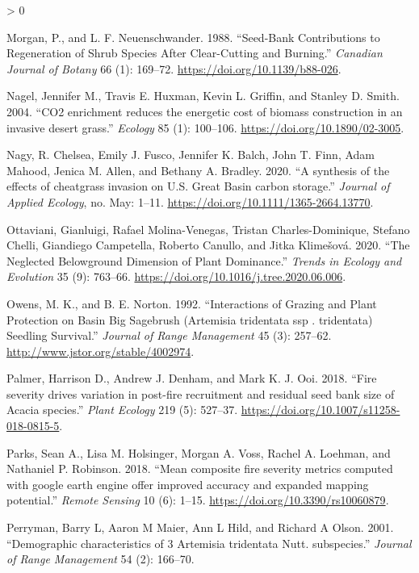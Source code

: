 \documentclass[
  12pt,
]{article}
\newlength{\cslhangindent}
\newenvironment{CSLReferences}[2] %
 {%
  \setlength{\parindent}{0pt}
  \ifodd #1 \everypar{\setlength{\hangindent}{\cslhangindent}}\ignorespaces\fi
  \ifnum #2 > 0
  \setlength{\parskip}{#2\baselineskip}
  \fi
 }%
 {}
\begin{document}
\begin{CSLReferences}{1}{0}
\leavevmode\hypertarget{ref-Morgan1988}{}%
Morgan, P., and L. F. Neuenschwander. 1988. {``Seed-Bank Contributions
to Regeneration of Shrub Species After Clear-Cutting and Burning.''}
\emph{Canadian Journal of Botany} 66 (1): 169--72.
\url{https://doi.org/10.1139/b88-026}.

\leavevmode\hypertarget{ref-Nagel2004}{}%
Nagel, Jennifer M., Travis E. Huxman, Kevin L. Griffin, and Stanley D.
Smith. 2004. {``{CO2 enrichment reduces the energetic cost of biomass
construction in an invasive desert grass}.''} \emph{Ecology} 85 (1):
100--106. \url{https://doi.org/10.1890/02-3005}.

\leavevmode\hypertarget{ref-Nagy2020}{}%
Nagy, R. Chelsea, Emily J. Fusco, Jennifer K. Balch, John T. Finn, Adam
Mahood, Jenica M. Allen, and Bethany A. Bradley. 2020. {``{A synthesis
of the effects of cheatgrass invasion on U.S. Great Basin carbon
storage}.''} \emph{Journal of Applied Ecology}, no. May: 1--11.
\url{https://doi.org/10.1111/1365-2664.13770}.

\leavevmode\hypertarget{ref-Ottaviani2020}{}%
Ottaviani, Gianluigi, Rafael Molina-Venegas, Tristan Charles-Dominique,
Stefano Chelli, Giandiego Campetella, Roberto Canullo, and Jitka
Klimešová. 2020. {``{The Neglected Belowground Dimension of Plant
Dominance}.''} \emph{Trends in Ecology and Evolution} 35 (9): 763--66.
\url{https://doi.org/10.1016/j.tree.2020.06.006}.

\leavevmode\hypertarget{ref-Owens1992}{}%
Owens, M. K., and B. E. Norton. 1992. {``{Interactions of Grazing and
Plant Protection on Basin Big Sagebrush (Artemisia tridentata ssp .
tridentata) Seedling Survival}.''} \emph{Journal of Range Management} 45
(3): 257--62. \url{http://www.jstor.org/stable/4002974}.

\leavevmode\hypertarget{ref-Palmer2018}{}%
Palmer, Harrison D., Andrew J. Denham, and Mark K. J. Ooi. 2018.
{``{Fire severity drives variation in post-fire recruitment and residual
seed bank size of Acacia species}.''} \emph{Plant Ecology} 219 (5):
527--37. \url{https://doi.org/10.1007/s11258-018-0815-5}.

\leavevmode\hypertarget{ref-Parks2018}{}%
Parks, Sean A., Lisa M. Holsinger, Morgan A. Voss, Rachel A. Loehman,
and Nathaniel P. Robinson. 2018. {``{Mean composite fire severity
metrics computed with google earth engine offer improved accuracy and
expanded mapping potential}.''} \emph{Remote Sensing} 10 (6): 1--15.
\url{https://doi.org/10.3390/rs10060879}.

\leavevmode\hypertarget{ref-Perryman2001}{}%
Perryman, Barry L, Aaron M Maier, Ann L Hild, and Richard A Olson. 2001.
{``{Demographic characteristics of 3 Artemisia tridentata Nutt.
subspecies}.''} \emph{Journal of Range Management} 54 (2): 166--70.


\end{CSLReferences}
\end{document}
